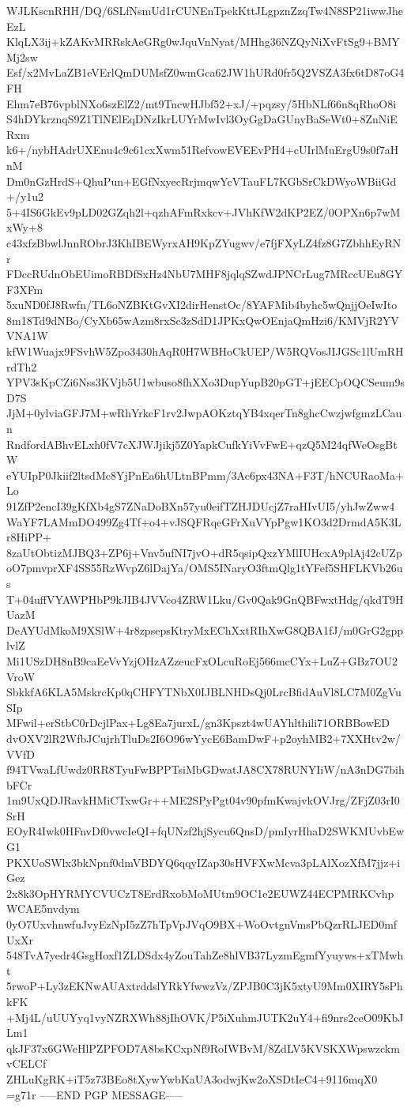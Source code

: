 WJLKscnRHH/DQ/6SLfNsmUd1rCUNEnTpekKttJLgpznZzqTw4N8SP21iwwJheEzL
KlqLX3ij+kZAKvMRRskAeGRg0wJquVnNyat/MHhg36NZQyNiXvFtSg9+BMYMj2sw
Esf/x2MvLaZB1eVErlQmDUMsfZ0wmGca62JW1hURd0fr5Q2VSZA3fx6tD87oG4FH
Ehm7eB76vpblNXo6szElZ2/mt9TncwHJbf52+xJ/+pqzsy/5HbNLf66n8qRhoO8i
S4hDYkrznqS9Z1TlNElEqDNzIkrLUYrMwIvl3OyGgDaGUnyBaSeWt0+8ZnNiERxm
k6+/nybHAdrUXEnu4c9c61cxXwm51RefvowEVEEvPH4+cUIrlMuErgU9s0f7aHnM
Dm0nGzHrdS+QhuPun+EGfNxyecRrjmqwYcVTauFL7KGbSrCkDWyoWBiiGd+/y1u2
5+4IS6GkEv9pLD02GZqh2l+qzhAFmRxkcv+JVhKfW2dKP2EZ/0OPXn6p7wMxWy+8
c43xfzBbwlJnnRObrJ3KhIBEWyrxAH9KpZYugwv/e7fjFXyLZ4fz8G7ZbhhEyRNr
FDccRUdnObEUimoRBDfSxHz4NbU7MHF8jqlqSZwdJPNCrLug7MRccUEu8GYF3XFm
5xuND0fJ8Rwfn/TL6oNZBKtGvXI2dirHenstOc/8YAFMib4byhc5wQnjjOeIwIto
8m18Td9dNBo/CyXb65wAzm8rxSc3zSdD1JPKxQwOEnjaQmHzi6/KMVjR2YVVNA1W
kfW1Wuajx9FSvhW5Zpo3430hAqR0H7WBHoCkUEP/W5RQVosJIJGSc1lUmRHrdTh2
YPV3sKpCZi6Nss3KVjb5U1wbuso8fhXXo3DupYupB20pGT+jEECpOQCSeum9sD7S
JjM+0ylviaGFJ7M+wRhYrkcF1rv2JwpAOKztqYB4xqerTn8ghcCwzjwfgmzLCaun
RndfordABhvELxh0fV7cXJWJjikj5Z0YapkCufkYiVvFwE+qzQ5M24qfWeOsgBtW
eYUIpP0Jkiif2ltsdMc8YjPnEa6hULtnBPmm/3Ac6px43NA+F3T/hNCURaoMa+Lo
91ZfP2encI39gKfXb4gS7ZNaDoBXn57yu0eifTZHJDUcjZ7raHIvUI5/yhJwZww4
WaYF7LAMmDO499Zg4Tf+o4+vJSQFRqeGFrXuVYpPgw1KO3d2DrmdA5K3Lr8HiPP+
8zaUtObtizMJBQ3+ZP6j+Vnv5ufNI7jvO+dR5qsipQxzYMlIUHcxA9plAj42cUZp
oO7pmvprXF4SS55RzWvpZ6lDajYa/OMS5INaryO3ftmQlg1tYFef5SHFLKVb26us
T+04uffVYAWPHbP9kJIB4JVVco4ZRW1Lku/Gv0Qak9GnQBFwxtHdg/qkdT9HUazM
DeAYUdMkoM9XSlW+4r8zpsepsKtryMxEChXxtRIhXwG8QBA1fJ/m0GrG2gpplvlZ
Mi1USzDH8nB9caEeVvYzjOHzAZzeucFxOLcuRoEj566mcCYx+LuZ+GBz7OU2VroW
SbkkfA6KLA5MskrcKp0qCHFYTNbX0IJBLNHDsQj0LrcBfidAuVl8LC7M0ZgVuSIp
MFwil+erStbC0rDcjlPax+Lg8Ea7jurxL/gn3Kpszt4wUAYhlthili71ORBBowED
dvOXV2lR2WfbJCujrhTluDs2I6O96wYycE6BamDwF+p2oyhMB2+7XXHtv2w/VVfD
f94TVwaLfUwdz0RR8TyuFwBPPTsiMbGDwatJA8CX78RUNYIiW/nA3nDG7bihbFCr
1m9UxQDJRavkHMiCTxwGr++ME2SPyPgt04v90pfmKwajvkOVJrg/ZFjZ03rI0SrH
EOyR4Iwk0HFnvDf0vwcIeQI+fqUNzf2hjSycu6QnsD/pmIyrHhaD2SWKMUvbEwG1
PKXUoSWlx3bkNpnf0dmVBDYQ6qqyIZap30sHVFXwMcva3pLAlXozXfM7jjz+iGez
2x8k3OpHYRMYCVUCzT8ErdRxobMoMUtm9OC1e2EUWZ44ECPMRKCvhpWCAE5nvdym
0yO7UxvhnwfuJvyEzNpI5zZ7hTpVpJVqO9BX+WoOvtgnVmsPbQzrRLJED0mfUxXr
548TvA7yedr4GsgHoxf1ZLDSdx4yZouTahZe8hlVB37LyzmEgmfYyuyws+xTMwht
5rwoP+Ly3zEKNwAUAxtrddslYRkYfwwzVz/ZPJB0C3jK5xtyU9Mm0XIRY5sPhkFK
+Mj4L/uUUYyq1vyNZRXWh88jIhOVK/P5iXuhmJUTK2uY4+fi9nrs2ceO09KbJLm1
qkJF37x6GWeHlPZPFOD7A8bsKCxpNf9RoIWBvM/8ZdLV5KVSKXWpswzckmvCELCf
ZHLuKgRK+iT5z73BEo8tXywYwbKaUA3odwjKw2oXSDtIeC4+9116mqX0
=g71r
-----END PGP MESSAGE-----
